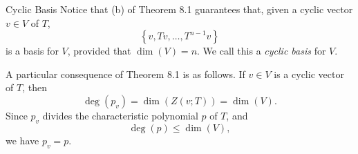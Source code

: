\documentclass[linearalgebra]{subfiles}
\begin{document}
    \begin{definition}{Cyclic Basis}{}
        Notice that (b) of Theorem 8.1 guarantees that, given a cyclic vector $v\in V$ of $T$,
        \begin{equation*}
            \left\lbrace v, Tv, \ldots, T^{n-1}v \right\rbrace 
        \end{equation*}
        is a basis for $V$, provided that $\dim(V)=n$. We call this a \emph{cyclic basis} for $V$.
    \end{definition}

    \begin{remark}
        A particular consequence of Theorem 8.1 is as follows. If $v\in V$ is a cyclic vector of $T$, then
        \begin{equation*}
            \deg(p_v) = \dim \left( Z(v;T) \right) = \dim(V).
        \end{equation*}
        Since $p_v$ divides the characteristic polynomial $p$ of $T$, and
        \begin{equation*}
            \deg(p)\leq\dim(V),
        \end{equation*}
        we have $p_v=p$.
    \end{remark}
\end{document}
